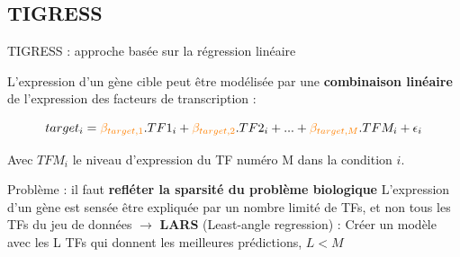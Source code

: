 
\subsection{TIGRESS}
	
\begin{frame}{TIGRESS : approche basée sur la régression linéaire}

L'expression d'un gène cible peut être modélisée par une \textbf{combinaison linéaire} de l'expression des facteurs de transcription :
    
    \begin{equation*}
    	   target_i = \textcolor{orange}{\beta_{target,1}}.TF1_i + \textcolor{orange}{\beta_{target,2}}.TF2_i + ... + \textcolor{orange}{\beta_{target,M}}.TFM_i  + \epsilon_i
    \end{equation*}
    
Avec $TFM_i$ le niveau d'expression du TF numéro M dans la condition $i$.
\vspace{0.3cm}


\begin{alertblock}{\small Problème : il faut \textbf{refléter la sparsité du problème biologique}}
\small L'expression d'un gène est sensée être expliquée par un nombre limité de TFs, et non tous les TFs du jeu de données $\rightarrow$ \textbf{LARS} (Least-angle regression) :
Créer un modèle avec les L TFs qui donnent les meilleures prédictions, $L<M$
\end{alertblock}

\end{frame}








